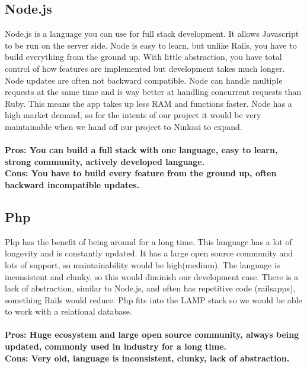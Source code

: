\documentclass[draftclsnofoot,onecolumn,letterpaper,10pt,compsoc]{IEEEtran}
\begin{document}
	\subsection{Node.js}
			Node.js is a language you can use for full stack development.
			It allows Javascript to be run on the server side.
			Node is easy to learn, but unlike Rails, you have to build everything from the ground up.
			With little abstraction, you have total control of how features are implemented but development takes much longer.
			Node updates are often not backward compatible.
			Node can handle multiple requests at the same time and is way better at handling concurrent requests than Ruby.
			This means the app takes up less RAM and functions faster.
			Node has a high market demand, so for the intents of our project it would be very maintainable when we hand off our project to Ninkasi to expand.
			\\ \\
			\textbf{Pros: You can build a full stack with one language, easy to learn, strong community, actively developed language.}
			\\
			\textbf{Cons: You have to build every feature from the ground up, often backward incompatible updates.}

	\subsection{Php}
	Php has the benefit of being around for a long time\cite{InfoWorld}.
	This language has a lot of longevity and is constantly updated. It has a large open source community and lots of support, so maintainability would be high(medium).
	The language is inconsistent and clunky, so this would diminish our development ease.
	There is a lack of abstraction, similar to Node.js, and often has repetitive code (railsapps), something Rails would reduce.
	Php fits into the LAMP stack so we would be able to work with a relational database.
		\\ \\
		\textbf{Pros: Huge ecosystem and large open source community, always being updated, commonly used in industry for a long time.}
		\\
		\textbf{Cons: Very old, language is inconsistent, clunky, lack of abstraction.}
\end{document}
